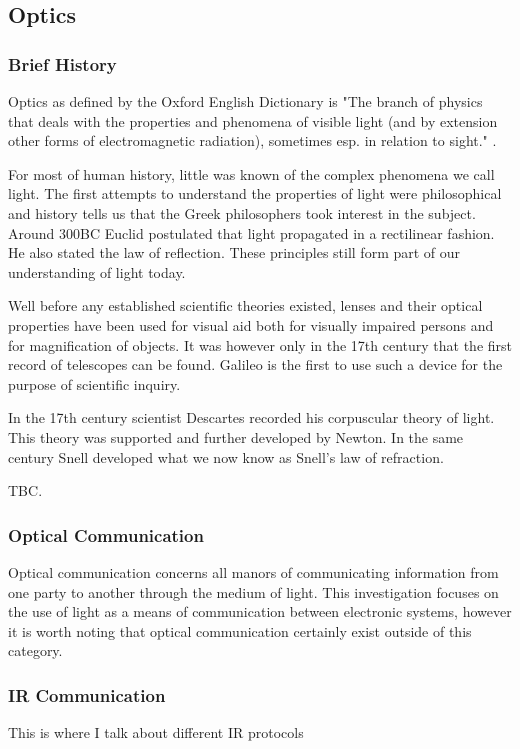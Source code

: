 
\subsection{Optics}

\subsubsection{Brief History}
Optics as defined by the Oxford English Dictionary is "The branch of physics that deals with the properties and phenomena of visible light (and by extension other forms of electromagnetic radiation), sometimes esp. in relation to sight." \cite{oed}.

For most of human history, little was known of the complex phenomena we call light. The first attempts to understand the properties of light were philosophical and history tells us that the Greek philosophers took interest in the subject. Around 300BC Euclid postulated that light propagated in a rectilinear fashion. He also stated the law of reflection. These principles still form part of our understanding of light today. \cite{Vohnsen_2004}

Well before any established scientific theories existed, lenses and their optical properties have been used for visual aid both for visually impaired persons and for magnification of objects. It was however only in the 17th century that the first record of telescopes can be found. Galileo is the first to use such a device for the purpose of scientific inquiry.

In the 17th century scientist Descartes recorded his corpuscular theory of light. This theory was supported and further developed by Newton. In the same century Snell developed what we now know as Snell's law of refraction.

TBC.

\subsubsection{Optical Communication}

Optical communication concerns all manors of communicating information from one party to another through the medium of light. This investigation focuses on the use of light as a means of communication between electronic systems, however it is worth noting that optical communication certainly exist outside of this category. 


\subsubsection{IR Communication}
This is where I talk about different IR protocols

